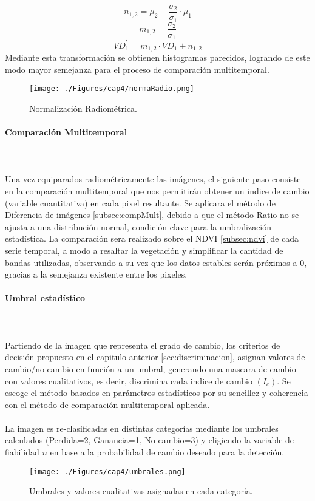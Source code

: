 			\begin{equation}
			n_{1,2}=\mu_{2}-\dfrac{\sigma_{2}}{\sigma_{1}}\cdot\mu_{1}
			\end{equation}
					\begin{equation}
					m_{1,2}=\dfrac{\sigma_{2}}{\sigma_{1}}
					\end{equation}
		\begin{equation}
				VD_{1}^{'}=m_{1,2}\cdot VD_{1}+n_{1,2}
		\end{equation}
	Mediante esta transformaci\'on se obtienen histogramas parecidos, logrando de este modo mayor semejanza para el proceso de comparaci\'on multitemporal.
	
	\begin{figure}[H]
		\centering
		\texttt{[image: ./Figures/cap4/normaRadio.png]}
		\caption{Normalizaci\'on Radiom\'etrica.}
		\label{fig:normRadio}
	\end{figure}
	
	
\paragraph{Comparaci\'on Multitemporal}\mbox{}\\\mbox{}\\
Una vez equiparados radiom\'etricamente las im\'agenes, el siguiente paso consiste en la comparaci\'on multitemporal que nos permitir\'an obtener un indice de cambio (variable cuantitativa) en cada pixel resultante. Se aplicara el m\'etodo de Diferencia de im\'agenes \ref{subsec:compMult}, debido a que el m\'etodo Ratio no se ajusta a una distribuci\'on normal, condici\'on clave para la umbralizaci\'on estad\'istica. La comparaci\'on sera realizado sobre el NDVI \ref{subsec:ndvi} de cada serie temporal, a modo a resaltar la vegetaci\'on y simplificar la cantidad de bandas utilizadas, observando a su vez que los datos estables ser\'an pr\'oximos a 0, gracias a la semejanza existente entre los pixeles. 
\paragraph{Umbral estad\'istico}\mbox{}\\\mbox{}\\
Partiendo de la imagen que representa el grado de cambio, los criterios de decisi\'on propuesto en el capitulo anterior \ref{sec:discriminacion}, asignan valores de cambio/no cambio en funci\'on a un umbral, generando una mascara de cambio con valores cualitativos, es decir, discrimina cada indice de cambio $ (I_{c}) $. Se escoge el m\'etodo basados en par\'ametros estad\'isticos por su sencillez y coherencia con el m\'etodo de comparaci\'on multitemporal aplicada. \\~\\
La imagen es re-clasificadas en distintas categor\'ias mediante los umbrales calculados (Perdida=2, Ganancia=1, No cambio=3) y eligiendo la variable de fiabilidad $ n $ en base a la probabilidad de cambio deseado para la detecci\'on.
	\begin{figure}[H]
		\centering
		\texttt{[image: ./Figures/cap4/umbrales.png]}
		\caption{Umbrales y valores cualitativas asignadas en cada categor\'ia.}
		\label{fig:umbrales}
	\end{figure}
